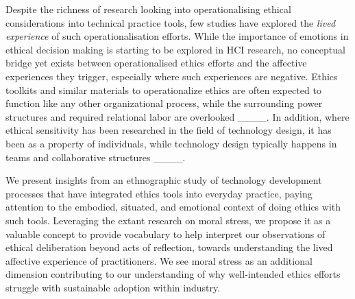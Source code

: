 Despite the richness of research looking into operationalising ethical considerations into technical practice tools, few studies have explored the \textit{lived experience} of such operationalisation efforts. While the importance of emotions in ethical decision making is starting to be explored in HCI research, no conceptual bridge yet exists between operationalised ethics efforts and the affective experiences they trigger, especially where such experiences are negative. Ethics toolkits and similar materials to operationalize ethics are often expected to function like any other organizational process, while the surrounding power structures and required relational labor are overlooked ____. In addition, where ethical sensitivity has been researched in the field of technology design, it has been as a property of individuals, while technology design typically happens in teams and collaborative structures ____. 

We present insights from an ethnographic study of technology development processes that have integrated ethics tools into everyday practice, paying attention to the embodied, situated, and emotional context of doing ethics with such tools. Leveraging the extant research on moral stress, we propose it as a valuable concept to provide vocabulary to help interpret our observations of ethical deliberation beyond acts of reflection, towards understanding the lived affective experience of practitioners. We see moral stress as an additional dimension contributing to our understanding of why well-intended ethics efforts struggle with sustainable adoption within industry.